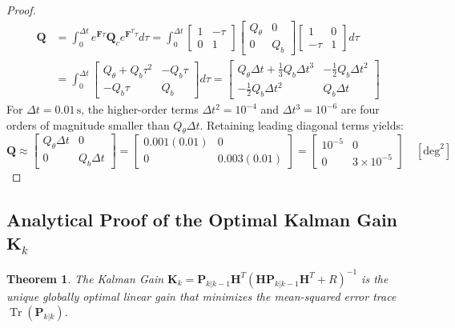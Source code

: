 \documentclass[11pt, a4paper]{article}
\newtheorem{theorem}{Theorem}[section]
\begin{document}
\begin{proof}
\begin{align}
    \mathbf{Q} &= \int_0^{\Delta t} e^{\mathbf{F}\tau} \mathbf{Q}_c e^{\mathbf{F}^T \tau} d\tau = \int_0^{\Delta t} \begin{bmatrix} 1 & -\tau \\ 0 & 1 \end{bmatrix} \begin{bmatrix} Q_\theta & 0 \\ 0 & Q_b \end{bmatrix} \begin{bmatrix} 1 & 0 \\ -\tau & 1 \end{bmatrix} d\tau \\
    &= \int_0^{\Delta t} \begin{bmatrix} Q_\theta + Q_b \tau^2 & -Q_b \tau \\ -Q_b \tau & Q_b \end{bmatrix} d\tau = \begin{bmatrix} Q_\theta \Delta t + \frac{1}{3} Q_b \Delta t^3 & -\frac{1}{2} Q_b \Delta t^2 \\ -\frac{1}{2} Q_b \Delta t^2 & Q_b \Delta t \end{bmatrix}
\end{align}
For $\Delta t = 0.01\,\text{s}$, the higher-order terms $\Delta t^2 = 10^{-4}$ and $\Delta t^3 = 10^{-6}$ are four orders of magnitude smaller than $Q_\theta \Delta t$. Retaining leading diagonal terms yields:
\begin{equation}
    \mathbf{Q} \approx \begin{bmatrix} Q_\theta \Delta t & 0 \\ 0 & Q_b \Delta t \end{bmatrix} = \begin{bmatrix} 0.001(0.01) & 0 \\ 0 & 0.003(0.01) \end{bmatrix} = \begin{bmatrix} 10^{-5} & 0 \\ 0 & 3 \times 10^{-5} \end{bmatrix} \quad [\text{deg}^2]
\end{equation}
\end{proof}

\subsection{Analytical Proof of the Optimal Kalman Gain $\mathbf{K}_k$}
\begin{theorem}
The Kalman Gain $\mathbf{K}_k = \mathbf{P}_{k|k-1} \mathbf{H}^T (\mathbf{H} \mathbf{P}_{k|k-1} \mathbf{H}^T + R)^{-1}$ is the unique globally optimal linear gain that minimizes the mean-squared error trace $\operatorname{Tr}(\mathbf{P}_{k|k})$.
\end{theorem}
\end{document}
